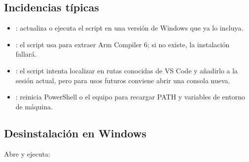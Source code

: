 \documentclass[letterpaper,10pt,english]{sphinxmanual}
\begin{document}
\subsection{Incidencias típicas}
\label{\detokenize{vscode:id6}}\begin{itemize}
\item {} 
\sphinxAtStartPar
{}: actualiza  o ejecuta el
script en una versión de Windows que ya lo incluya.

\item {} 
\sphinxAtStartPar
{}: el script usa  para extraer
Arm Compiler 6; si no existe, la instalación fallará.

\item {} 
\sphinxAtStartPar
{}: el script intenta localizar  en
rutas conocidas de VS Code y añadirlo a la sesión actual, pero para usos
futuros conviene abrir una consola nueva.

\item {} 
\sphinxAtStartPar
{}: reinicia PowerShell o el
equipo para recargar PATH y variables de entorno de máquina.

\end{itemize}


\subsection{Desinstalación en Windows}
\label{\detokenize{vscode:desinstalacion-en-windows}}
\sphinxAtStartPar
Abre  y ejecuta:

\begin{sphinxVerbatim}[commandchars=\\\{\}]
    
\end{sphinxVerbatim}
\end{document}
